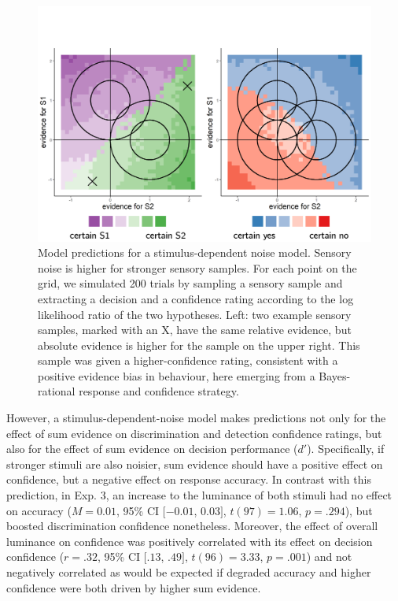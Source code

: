 \documentclass[12pt,twoside]{reedthesis}
\begin{document}
\begin{figure}
\includegraphics[width=\textwidth]{figure/RC/2dmodel_2_enhanced} \caption[Model predictions for a stimulus-dependent noise model.]{Model predictions for a stimulus-dependent noise model. Sensory noise is higher for stronger sensory samples. For each point on the grid, we simulated 200 trials by sampling a sensory sample and extracting a decision and a confidence rating according to the log likelihood ratio of the two hypotheses. Left: two example sensory samples, marked with an X, have the same relative evidence, but absolute evidence is higher for the sample on the upper right. This sample was given a higher-confidence rating, consistent with a positive evidence bias in behaviour, here emerging from a Bayes-rational response and confidence strategy.}\label{fig:RC-2d-model-2}
\end{figure}
However, a stimulus-dependent-noise model makes predictions not only for the effect of sum evidence on discrimination and detection confidence ratings, but also for the effect of sum evidence on decision performance (\(d'\)). Specifically, if stronger stimuli are also noisier, sum evidence should have a positive effect on confidence, but a negative effect on response accuracy. In contrast with this prediction, in Exp. 3, an increase to the luminance of both stimuli had no effect on accuracy (\(M = 0.01\), 95\% CI \([-0.01\), \(0.03]\), \(t(97) = 1.06\), \(p = .294\)), but boosted discrimination confidence nonetheless. Moreover, the effect of overall luminance on confidence was positively correlated with its effect on decision confidence (\(r = .32\), 95\% CI \([.13\), \(.49]\), \(t(96) = 3.33\), \(p = .001\)) and not negatively correlated as would be expected if degraded accuracy and higher confidence were both driven by higher sum evidence.
\end{document}

